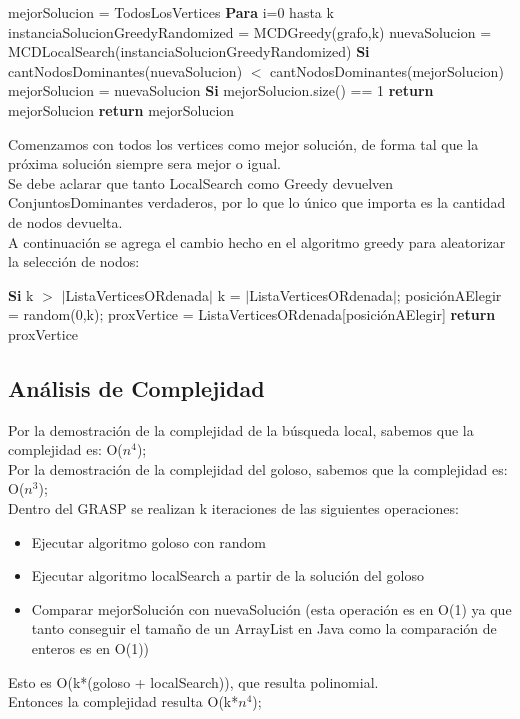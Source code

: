 \begin{codebox}
\li	mejorSolucion = TodosLosVertices
\li \textbf{Para} i=0 hasta k \Do
\li 	instanciaSolucionGreedyRandomized = MCDGreedy(grafo,k)
\li	nuevaSolucion = MCDLocalSearch(instanciaSolucionGreedyRandomized)
\li 	\textbf{Si} cantNodosDominantes(nuevaSolucion) $<$ cantNodosDominantes(mejorSolucion)  \Do
\li		mejorSolucion = nuevaSolucion
\li		\textbf{Si} mejorSolucion.size() == 1 \Do
\li			\textbf{return} mejorSolucion
		\End
	\End
    \End	
\li	\textbf{return} mejorSolucion	
\end{codebox}
Comenzamos con todos los vertices como mejor solución, de forma tal que la próxima solución siempre sera mejor o igual.\\
Se debe aclarar que tanto LocalSearch como Greedy devuelven ConjuntosDominantes verdaderos, por lo que lo único que importa es la cantidad de nodos devuelta.\\

A continuación se agrega el cambio hecho en el algoritmo greedy para aleatorizar la selección de nodos:\\
\begin{codebox}
\li     \textbf{Si} k $>$ $|$ListaVerticesORdenada$|$ \Do
\li 		k = $|$ListaVerticesORdenada$|$;
\End
\li 	posiciónAElegir = random(0,k);
\li	proxVertice = ListaVerticesORdenada[posiciónAElegir]
\li 	\textbf{return} proxVertice
\end{codebox}

\subsection{Análisis de Complejidad}
Por la demostración de la complejidad de la búsqueda local, sabemos que la complejidad es: O($n^4$);\\
Por la demostración de la complejidad del goloso, sabemos que la complejidad es: O($n^3$);\\
Dentro del GRASP se realizan k iteraciones de las siguientes operaciones:
\begin{itemize}
\item Ejecutar algoritmo goloso con random
\item Ejecutar algoritmo localSearch a partir de la solución del goloso
\item Comparar mejorSolución con nuevaSolución (esta operación es en O(1) ya que tanto conseguir el tamaño de un ArrayList en Java como la comparación de enteros es en O(1)) 
\end{itemize}
Esto es O(k*(goloso + localSearch)), que resulta polinomial.\\
Entonces la complejidad resulta O(k*$n^4$);


